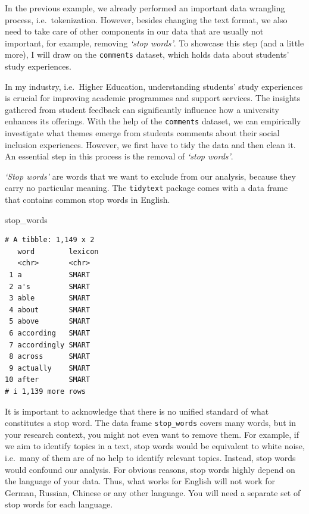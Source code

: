 \documentclass[
  letterpaper,
]{krantz}
\makeatletter
\newenvironment{Shaded}{\begin{snugshade}}{\end{snugshade}}
\newcommand{\NormalTok}[1]{\textcolor[rgb]{0.00,0.23,0.31}{#1}}
\newenvironment{kframe}{%
\medskip{}
\setlength{\fboxsep}{.8em}
 \def\at@end@of@kframe{}%
 \ifinner\ifhmode%
  \def\at@end@of@kframe{\end{minipage}}%
  \begin{minipage}{\columnwidth}%
 \fi\fi%
 \def\FrameCommand##1{\hskip\@totalleftmargin \hskip-\fboxsep
 \colorbox{shadecolor}{##1}\hskip-\fboxsep
     \hskip-\linewidth \hskip-\@totalleftmargin \hskip\columnwidth}%
 \MakeFramed {\advance\hsize-\width
   \@totalleftmargin\z@ \linewidth\hsize
   \@setminipage}}%
 {\par\unskip\endMakeFramed%
 \at@end@of@kframe}
\renewenvironment{Shaded}{\begin{kframe}}{\end{kframe}}
\makeatother
\begin{document}
In the previous example, we already performed an important data
wrangling process, i.e.~tokenization. However, besides changing the text
format, we also need to take care of other components in our data that
are usually not important, for example, removing \emph{`stop words'}. To
showcase this step (and a little more), I will draw on the
\texttt{comments} dataset, which holds data about students' study
experiences.

In my industry, i.e.~Higher Education, understanding students' study
experiences is crucial for improving academic programmes and support
services. The insights gathered from student feedback can significantly
influence how a university enhances its offerings. With the help of the
\texttt{comments} dataset, we can empirically investigate what themes
emerge from students comments about their social inclusion experiences.
However, we first have to tidy the data and then clean it. An essential
step in this process is the removal of \emph{`stop words'}.

\emph{`Stop words'} are words that we want to exclude from our analysis,
because they carry no particular meaning. The \texttt{tidytext} package
comes with a data frame that contains common stop words in English.

\begin{Shaded}
\begin{Highlighting}[]
\NormalTok{stop\_words}
\end{Highlighting}
\end{Shaded}

\begin{verbatim}
# A tibble: 1,149 x 2
   word        lexicon
   <chr>       <chr>  
 1 a           SMART  
 2 a's         SMART  
 3 able        SMART  
 4 about       SMART  
 5 above       SMART  
 6 according   SMART  
 7 accordingly SMART  
 8 across      SMART  
 9 actually    SMART  
10 after       SMART  
# i 1,139 more rows
\end{verbatim}

It is important to acknowledge that there is no unified standard of what
constitutes a stop word. The data frame \texttt{stop\_words} covers many
words, but in your research context, you might not even want to remove
them. For example, if we aim to identify topics in a text, stop words
would be equivalent to white noise, i.e.~many of them are of no help to
identify relevant topics. Instead, stop words would confound our
analysis. For obvious reasons, stop words highly depend on the language
of your data. Thus, what works for English will not work for German,
Russian, Chinese or any other language. You will need a separate set of
stop words for each language.
\end{document}
